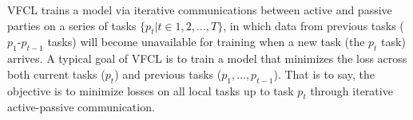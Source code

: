 VFCL trains a model via iterative communications between active and passive parties on a series of tasks $\{p_t | t\in 1, 2, \dots, T\}$, in which data from previous tasks ($p_1$-$p_{t-1}$ tasks) will become unavailable for training when a new task (the $p_t$ task) arrives.
A typical goal of VFCL is to train a model that minimizes the loss across both current tasks ($p_t$) and previous tasks ($p_1, \dots, p_{t-1}$).
That is to say, the objective is to minimize losses on all local tasks up to task $p_t$ through iterative active-passive communication. 




